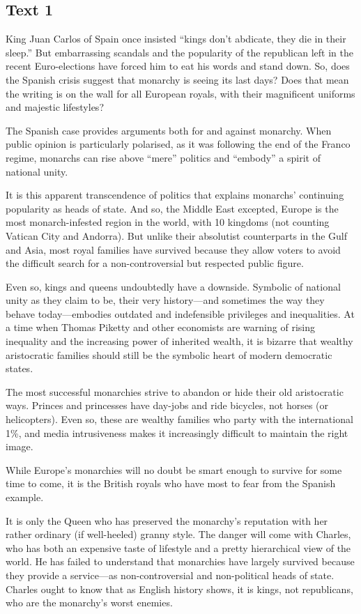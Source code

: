 \newpage
\subsection{Text 1}


King Juan Carlos of Spain once insisted ``kings don't abdicate, they die
in their sleep.'' But embarrassing scandals and the popularity of the
republican left in the recent Euro-elections have forced him to eat his
words and stand down. So, does the Spanish crisis suggest that monarchy
is seeing its last days? Does that mean the writing is on the wall for
all European royals, with their magnificent uniforms and majestic
lifestyles?

The Spanish case provides arguments both for and against monarchy. When
public opinion is particularly polarised, as it was following the end of
the Franco regime, monarchs can rise above ``mere'' politics and
``embody'' a spirit of national unity.

It is this apparent transcendence of politics that explains monarchs'
continuing popularity as heads of state. And so, the Middle East
excepted, Europe is the most monarch-infested region in the world, with
10 kingdoms (not counting Vatican City and Andorra). But unlike their
absolutist counterparts in the Gulf and Asia, most royal families have
survived because they allow voters to avoid the difficult search for a
non-controversial but respected public figure.

Even so, kings and queens undoubtedly have a downside. Symbolic of
national unity as they claim to be, their very history---and sometimes
the way they behave today---embodies outdated and indefensible
privileges and inequalities. At a time when Thomas Piketty and other
economists are warning of rising inequality and the increasing power of
inherited wealth, it is bizarre that wealthy aristocratic families
should still be the symbolic heart of modern democratic states.

The most successful monarchies strive to abandon or hide their old
aristocratic ways. Princes and princesses have day-jobs and ride
bicycles, not horses (or helicopters). Even so, these are wealthy
families who party with the international 1\%, and media intrusiveness
makes it increasingly difficult to maintain the right image.

While Europe's monarchies will no doubt be smart enough to survive for
some time to come, it is the British royals who have most to fear from
the Spanish example.

It is only the Queen who has preserved the monarchy's reputation with
her rather ordinary (if well-heeled) granny style. The danger will come
with Charles, who has both an expensive taste of lifestyle and a pretty
hierarchical view of the world. He has failed to understand that
monarchies have largely survived because they provide a service---as
non-controversial and non-political heads of state. Charles ought to
know that as English history shows, it is kings, not republicans, who
are the monarchy's worst enemies.


